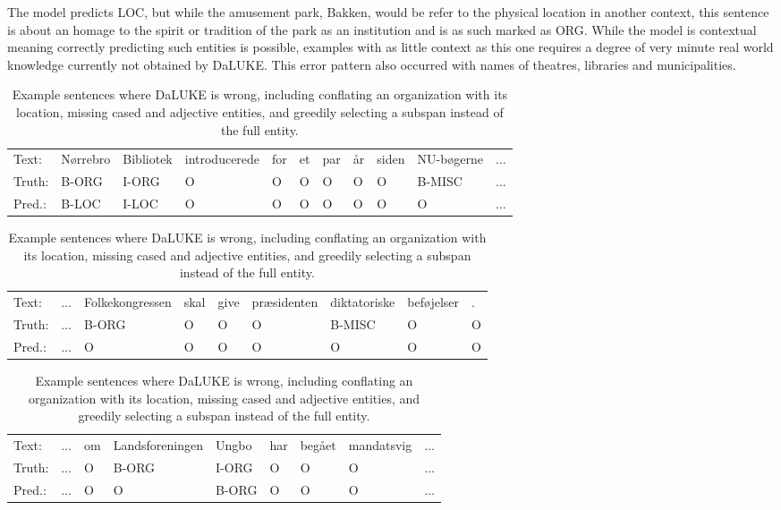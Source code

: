 \documentclass[main.tex]{subfiles}
\begin{document}
The model predicts LOC, but while the amusement park, Bakken, would be refer to the physical location in another context, this sentence is about an homage to the spirit or tradition of the park as an institution and is as such marked as ORG.
While the model is contextual meaning correctly predicting such entities is possible, examples with as little context as this one requires a degree of very minute real world knowledge currently not obtained by DaLUKE.
This error pattern also occurred with names of theatres, libraries and municipalities.
\begin{table}[H]
    \footnotesize
    \begin{tabular}{l|llllllllll}
        Text:   & Nørrebro  & Bibliotek  & introducerede  &for  &et  &par  &år  &siden  &NU-bøgerne & $\ldots$ \\
        Truth:  & B-ORG     & I-ORG      & O              &O    &O   &O    &O   &O      &B-MISC  & $\ldots$    \\
        Pred.:   & B-LOC     & I-LOC      & O              &O    &O   &O    &O   &O      &O   & $\ldots$\\\hline
    \end{tabular}\par
    \begin{tabular}{l|llllllll}
        Text:    & $\ldots$  &Folkekongressen  &skal  &give  &præsidenten  &diktatoriske  &beføjelser  &.\\
        Truth:   & $\ldots$  &B-ORG            &O     &O     &O            &B-MISC        &O           &O\\
        Pred.:   & $\ldots$  &O                &O     &O     &O            &O             &O           &O\\\hline
    \end{tabular}\par
    \begin{tabular}{l|llllllll}
        Text:    & $\ldots$ &  om  &Landsforeningen  &Ungbo  &har  &begået  &mandatsvig  & $\ldots$ \\
        Truth:   & $\ldots$ &  O   &B-ORG            &I-ORG  &O    &O       &O           & $\ldots$ \\
        Pred.:   & $\ldots$ &  O   &O                &B-ORG  &O    &O       &O           & $\ldots$
    \end{tabular}
    \caption{
        Example sentences where DaLUKE is wrong, including conflating an organization with its location, missing cased and adjective entities, and greedily selecting a subspan instead of the full entity.
    }
    \label{tab:dalukeerrors}
\end{table}\noindent
\end{document}
